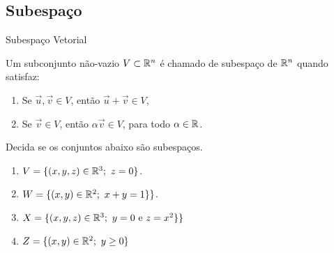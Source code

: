 
\subsection*{Subespaço}
\begin{frame}[label=lild]{Subespaço Vetorial}
\begin{defin}
Um subconjunto {\color{red}não-vazio} $V\subset\mathbb{R}^n$ é chamado de {\color{blue} subespaço} de $\mathbb{R}^n$ quando satisfaz:
\begin{enumerate}
\item Se $\vec{u},\vec{v}\in V$, então $\vec{u}+\vec{v}\in V$,
\item Se $\vec{v}\in V$, então $\alpha\vec{v}\in V$, para todo $\alpha\in \mathbb{R}$.
\end{enumerate}
\end{defin}
\begin{exe} Decida se os conjuntos abaixo são subespaços.
\begin{enumerate}
\item $V=\{(x,y,z)\in \R^3;\ z=0\}$.
\item \(W=\{(x,y)\in \R^2;\ x+y=1\}\}\).
\item \(X=\{(x,y,z)\in \mathbb{R}^3;\ y=0 \text{ e } z=x^2\}\}\) 
\item \(Z=\{(x,y)\in \mathbb{R}^2;\ y\geq 0  \} \)
\end{enumerate}
\end{exe}

\end{frame}



